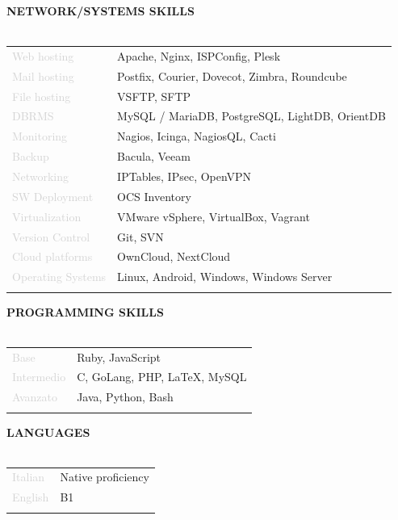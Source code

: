 \documentclass{article}
\begin{document}
\textbf{\textcolor{deepblue}{NETWORK/SYSTEMS SKILLS}} \\\\ \hfill
\begin{tabular}{ R{4cm} l }
	\textcolor{lightgray}{Web hosting}       & Apache, Nginx, ISPConfig, Plesk                \\ \hfill
	\textcolor{lightgray}{Mail hosting}      & Postfix, Courier, Dovecot, Zimbra, Roundcube   \\ \hfill
	\textcolor{lightgray}{File hosting}      & VSFTP, SFTP                                    \\ \hfill
	\textcolor{lightgray}{DBRMS}             & MySQL / MariaDB, PostgreSQL, LightDB, OrientDB \\ \hfill
	\textcolor{lightgray}{Monitoring}        & Nagios, Icinga, NagiosQL, Cacti                \\ \hfill
	\textcolor{lightgray}{Backup}            & Bacula, Veeam                                  \\ \hfill
	\textcolor{lightgray}{Networking}        & IPTables, IPsec, OpenVPN                       \\ \hfill
	\textcolor{lightgray}{SW Deployment}     & OCS Inventory                                  \\ \hfill
	\textcolor{lightgray}{Virtualization}    & VMware vSphere, VirtualBox, Vagrant            \\ \hfill
	\textcolor{lightgray}{Version Control}   & Git, SVN                                       \\ \hfill
	\textcolor{lightgray}{Cloud platforms}   & OwnCloud, NextCloud                            \\ \hfill
	\textcolor{lightgray}{Operating Systems} & Linux, Android, Windows, Windows Server        \\ \hfill
\end{tabular}

\textbf{\textcolor{deepblue}{PROGRAMMING SKILLS}} \\\\ \hfill
\begin{tabular}{ R{4cm} l }
	\textcolor{lightgray}{Base}       & Ruby, JavaScript                \\ \hfill
	\textcolor{lightgray}{Intermedio} & C, GoLang, PHP, LaTeX, MySQL    \\ \hfill
	\textcolor{lightgray}{Avanzato}   & Java, Python, Bash              \\ \hfill
\end{tabular}

\textbf{\textcolor{deepblue}{LANGUAGES}} \\\\ \hfill
\begin{tabular}{ R{4cm} l }
	\textcolor{lightgray}{Italian} & Native proficiency \\ \hfill
	\textcolor{lightgray}{English} & B1                 \\ \hfill
\end{tabular}
\end{document}
